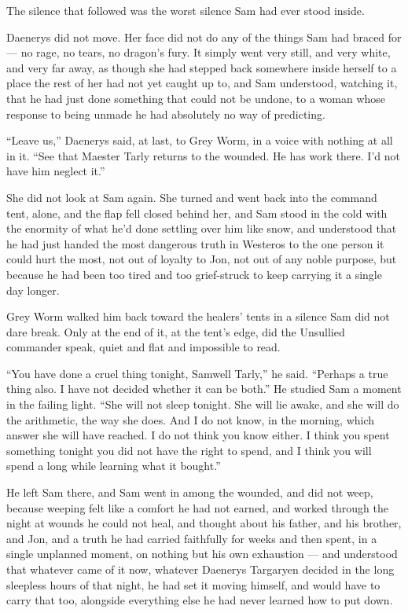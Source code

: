 The silence that followed was the worst silence Sam had ever stood inside.

Daenerys did not move. Her face did not do any of the things Sam had braced for — no rage, no tears, no dragon’s fury. It simply went very still, and very white, and very far away, as though she had stepped back somewhere inside herself to a place the rest of her had not yet caught up to, and Sam understood, watching it, that he had just done something that could not be undone, to a woman whose response to being unmade he had absolutely no way of predicting.

“Leave us,” Daenerys said, at last, to Grey Worm, in a voice with nothing at all in it. “See that Maester Tarly returns to the wounded. He has work there. I’d not have him neglect it.”

She did not look at Sam again. She turned and went back into the command tent, alone, and the flap fell closed behind her, and Sam stood in the cold with the enormity of what he’d done settling over him like snow, and understood that he had just handed the most dangerous truth in Westeros to the one person it could hurt the most, not out of loyalty to Jon, not out of any noble purpose, but because he had been too tired and too grief-struck to keep carrying it a single day longer.

\sceneBreak

Grey Worm walked him back toward the healers’ tents in a silence Sam did not dare break. Only at the end of it, at the tent’s edge, did the Unsullied commander speak, quiet and flat and impossible to read.

“You have done a cruel thing tonight, Samwell Tarly,” he said. “Perhaps a true thing also. I have not decided whether it can be both.” He studied Sam a moment in the failing light. “She will not sleep tonight. She will lie awake, and she will do the arithmetic, the way she does. And I do not know, in the morning, which answer she will have reached. I do not think you know either. I think you spent something tonight you did not have the right to spend, and I think you will spend a long while learning what it bought.”

He left Sam there, and Sam went in among the wounded, and did not weep, because weeping felt like a comfort he had not earned, and worked through the night at wounds he could not heal, and thought about his father, and his brother, and Jon, and a truth he had carried faithfully for weeks and then spent, in a single unplanned moment, on nothing but his own exhaustion — and understood that whatever came of it now, whatever Daenerys Targaryen decided in the long sleepless hours of that night, he had set it moving himself, and would have to carry that too, alongside everything else he had never learned how to put down.